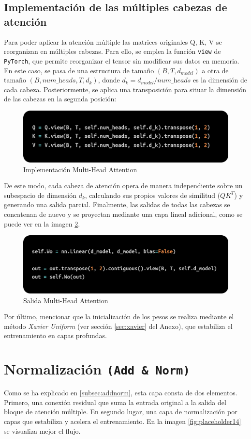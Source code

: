 \documentclass[11pt]{book}
\begin{document}
\subsection{Implementación de las múltiples cabezas de atención}

Para poder aplicar la atención múltiple las matrices originales Q, K, V se reorganizan en múltiples cabezas. Para ello, se emplea la función \texttt{view} de \texttt{PyTorch}, que permite reorganizar el tensor sin modificar sus datos en memoria. En este caso, se pasa de una estructura de tamaño $(B, T, d_{model})$ a otra de tamaño $(B, \textit{num\_heads}, T, d_k)$, donde $d_k = d_{model} / \textit{num\_heads}$ es la dimensión de cada cabeza. Posteriormente, se aplica una transposición para situar la dimensión de las cabezas en la segunda posición:

\begin{figure}[h]
    \centering
    \includegraphics[width=0.5\linewidth]{img/heads.png}
    \caption{Implementación Multi-Head Attention}
    \label{fig:placeholder11}
\end{figure}

De este modo, cada cabeza de atención opera de manera independiente sobre un subespacio de dimensión $d_k$, calculando sus propios valores de similitud ($QK^T$) y generando una salida parcial. Finalmente, las salidas de todas las cabezas se concatenan de nuevo y se proyectan mediante una capa lineal adicional, como se puede ver en la imagen \ref{fig:placeholder12}.

\begin{figure}[h]
    \centering
    \includegraphics[width=0.5\linewidth]{img/heads2.png}
    \caption{Salida Multi-Head Attention}
    \label{fig:placeholder12}
\end{figure}

Por último, mencionar que la inicialización de los pesos se realiza mediante el método \textit{Xavier Uniform} (ver sección \ref{sec:xavier} del Anexo), que estabiliza el entrenamiento en capas profundas. 

\section{Normalización \texttt{(Add \& Norm)}}
Como se ha explicado en \ref{subsec:addnorm}, esta capa consta de dos elementos. Primero, una conexión residual que suma la entrada original a la salida del bloque de atención múltiple. En segundo lugar, una capa de normalización por capas que estabiliza y acelera el entrenamiento. En la imagen \ref{fig:placeholder14} se visualiza mejor el flujo.
\end{document}
